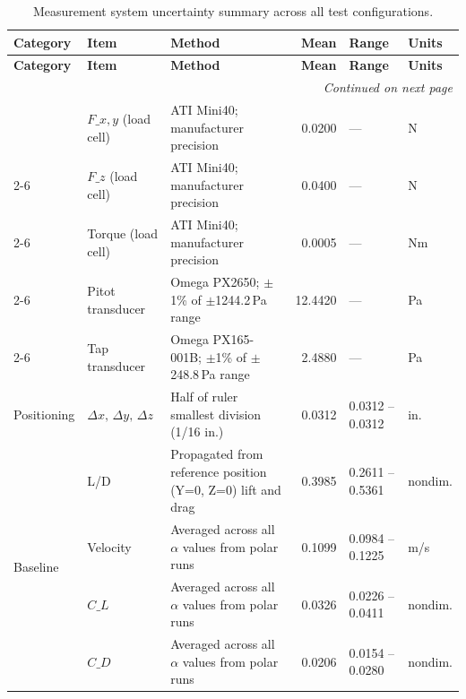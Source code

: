         \footnotesize
        \renewcommand{\arraystretch}{0.75}
        \begin{longtable}{l p{1.8cm} p{4.0cm} r p{1.8cm} l}
        \caption{Measurement system uncertainty summary across all test configurations.} \label{tab:uncertainty_summary} \\
        \hline
        \textbf{Category} & \textbf{Item} & \textbf{Method} & \textbf{Mean} & \textbf{Range} & \textbf{Units} \\
        \hline
        \endfirsthead
        \hline
        \textbf{Category} & \textbf{Item} & \textbf{Method} & \textbf{Mean} & \textbf{Range} & \textbf{Units} \\
        \hline
        \endhead
        \hline \multicolumn{6}{r}{\textit{Continued on next page}} \\
        \endfoot
        \hline
        \endlastfoot
        \multirow{5}{*}{Equipment} & $F\_{x,y}$ (load cell) & ATI Mini40; manufacturer precision & 0.0200 & --- & N \\
        \cline{2-6}
         & $F\_z$ (load cell) & ATI Mini40; manufacturer precision & 0.0400 & --- & N \\
        \cline{2-6}
         & Torque (load cell) & ATI Mini40; manufacturer precision & 0.0005 & --- & Nm \\
        \cline{2-6}
         & Pitot transducer & Omega PX2650; $\pm$1\% of $\pm$1244.2\,Pa range & 12.4420 & --- & Pa \\
        \cline{2-6}
         & Tap transducer & Omega PX165-001B; $\pm$1\% of $\pm$248.8\,Pa range & 2.4880 & --- & Pa \\
        \hline
        \multirow{1}{*}{Positioning} & $\Delta x,\, \Delta y,\, \Delta z$ & Half of ruler smallest division (1/16 in.) & 0.0312 & 0.0312 -- 0.0312 & in. \\
        \hline
        \multirow{5}{*}{Baseline} & L/D & Propagated from reference position (Y=0, Z=0) lift and drag & 0.3985 & 0.2611 -- 0.5361 & nondim. \\
        \cline{2-6}
         & Velocity & Averaged across all $\alpha$ values from polar runs & 0.1099 & 0.0984 -- 0.1225 & m/s \\
        \cline{2-6}
         & $C\_{L}$ & Averaged across all $\alpha$ values from polar runs & 0.0326 & 0.0226 -- 0.0411 & nondim. \\
        \cline{2-6}
         & $C\_{D}$ & Averaged across all $\alpha$ values from polar runs & 0.0206 & 0.0154 -- 0.0280 & nondim. \\

\end{longtable}
